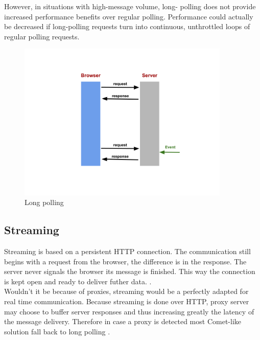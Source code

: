 However, in situations with high-message volume, long- polling does not provide increased performance benefits over regular polling. Performance could actually be decreased if long-polling requests turn into continuous, unthrottled loops of regular polling requests.\\

\begin{figure}[htbp]
	\centering
		\includegraphics[width=0.9\textwidth]{./Figures/long_polling.png}
	\caption[long_polling]{Long polling}
	\label{fig:long_polling}
\end{figure}
	
\subsection{Streaming}

Streaming is based on a persistent HTTP connection. The communication still begins with a request from the browser, the difference is in the response. The server never signals the browser its message is finished. This way the connection is kept open and ready to deliver futher data. \citep{Reference2}.\\

Wouldn't it be because of proxies, streaming would be a perfectly adapted for real time communication. Because streaming is done over HTTP,  proxy server may choose to buffer server responses and thus increasing greatly the latency of the message delivery. Therefore in case a proxy is detected most Comet-like solution fall back to long polling \citep{Reference2}.\\

